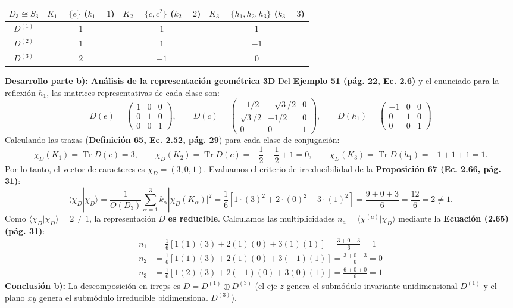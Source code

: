 \documentclass[11pt, a4paper]{article}
\begin{document}
\begin{center}
\begin{tabular}{c|ccc}
\toprule
$D_3 \cong S_3$ & $K_1 = \{e\}$ ($k_1=1$) & $K_2 = \{c, c^2\}$ ($k_2=2$) & $K_3 = \{h_1, h_2, h_3\}$ ($k_3=3$) \\
\midrule
$D^{(1)}$ & $1$ & $1$ & $1$ \\
$D^{(2)}$ & $1$ & $1$ & $-1$ \\
$D^{(3)}$ & $2$ & $-1$ & $0$ \\
\bottomrule
\end{tabular}
\end{center}

\noindent \textbf{Desarrollo parte b): Análisis de la representación geométrica 3D}
Del \textbf{Ejemplo 51 (pág. 22, Ec. 2.6)} y el enunciado para la reflexión $h_1$, las matrices representativas de cada clase son:
\[
D(e) = \begin{pmatrix} 1 & 0 & 0 \\ 0 & 1 & 0 \\ 0 & 0 & 1 \end{pmatrix}, \qquad D(c) = \begin{pmatrix} -1/2 & -\sqrt{3}/2 & 0 \\ \sqrt{3}/2 & -1/2 & 0 \\ 0 & 0 & 1 \end{pmatrix}, \qquad D(h_1) = \begin{pmatrix} -1 & 0 & 0 \\ 0 & 1 & 0 \\ 0 & 0 & 1 \end{pmatrix}
\]
Calculando las trazas (\textbf{Definición 65, Ec. 2.52, pág. 29}) para cada clase de conjugación:
\[
\chi_D(K_1) = \operatorname{Tr} D(e) = 3, \qquad \chi_D(K_2) = \operatorname{Tr} D(c) = -\frac{1}{2} - \frac{1}{2} + 1 = 0, \qquad \chi_D(K_3) = \operatorname{Tr} D(h_1) = -1 + 1 + 1 = 1.
\]
Por lo tanto, el vector de caracteres es $\chi_D = (3, 0, 1)$. Evaluamos el criterio de irreducibilidad de la \textbf{Proposición 67 (Ec. 2.66, pág. 31)}:
\[
\langle \chi_D | \chi_D \rangle = \frac{1}{O(D_3)} \sum_{\alpha=1}^3 k_\alpha |\chi_D(K_\alpha)|^2 = \frac{1}{6} \left[ 1 \cdot (3)^2 + 2 \cdot (0)^2 + 3 \cdot (1)^2 \right] = \frac{9 + 0 + 3}{6} = \frac{12}{6} = 2 \neq 1.
\]
Como $\langle \chi_D | \chi_D \rangle = 2 \neq 1$, la representación $D$ \textbf{es reducible}. Calculamos las multiplicidades $n_a = \langle \chi^{(a)} | \chi_D \rangle$ mediante la \textbf{Ecuación (2.65) (pág. 31)}:
\begin{align*}
n_1 &= \frac{1}{6} \left[ 1(1)(3) + 2(1)(0) + 3(1)(1) \right] = \frac{3 + 0 + 3}{6} = 1 \\
n_2 &= \frac{1}{6} \left[ 1(1)(3) + 2(1)(0) + 3(-1)(1) \right] = \frac{3 + 0 - 3}{6} = 0 \\
n_3 &= \frac{1}{6} \left[ 1(2)(3) + 2(-1)(0) + 3(0)(1) \right] = \frac{6 + 0 + 0}{6} = 1
\end{align*}
\textbf{Conclusión b):} La descomposición en irreps es $D = D^{(1)} \oplus D^{(3)}$ (el eje $z$ genera el submódulo invariante unidimensional $D^{(1)}$ y el plano $xy$ genera el submódulo irreducible bidimensional $D^{(3)}$).
\end{document}
